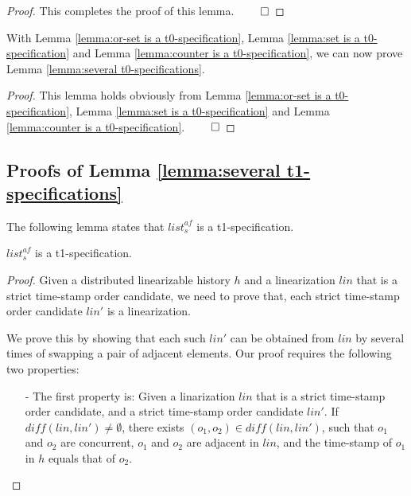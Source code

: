 {\begin {proof}
This completes the proof of this lemma. $\qed$
\end {proof}


With Lemma \ref{lemma:or-set is a t0-specification}, Lemma \ref{lemma:set is a t0-specification} and Lemma \ref{lemma:counter is a t0-specification}, we can now prove Lemma \ref{lemma:several t0-specifications}.


\SeveralTZeroSpecifications*

\begin {proof}
This lemma holds obviously from Lemma \ref{lemma:or-set is a t0-specification}, Lemma \ref{lemma:set is a t0-specification} and Lemma \ref{lemma:counter is a t0-specification}. $\qed$
\end {proof}





\subsection{Proofs of Lemma \ref{lemma:several t1-specifications}}
\label{subsec:appendix proofs of Lemma several t1-specifications}


The following lemma states that $\mathit{list}_s^{\mathit{af}}$ is a t1-specification.

\begin{lemma}
\label{lemma:list-af is a t1-specification}
$\mathit{list}_s^{\mathit{af}}$ is a t1-specification.
\end{lemma}

\begin {proof}

Given a distributed linearizable history $h$ and a linearization $\mathit{lin}$ that is a strict time-stamp order candidate, we need to prove that, each strict time-stamp order candidate $\mathit{lin}'$ is a linearization.

We prove this by showing that each such $\mathit{lin}'$ can be obtained from $\mathit{lin}$ by several times of swapping a pair of adjacent elements. Our proof requires the following two properties:

\begin{itemize}
\setlength{\itemsep}{0.5pt}
\item[-] The first property is: Given a linarization $\mathit{lin}$ that is a strict time-stamp order candidate, and a strict time-stamp order candidate $\mathit{lin}'$. If $\mathit{diff}(\mathit{lin},\mathit{lin}') \neq \emptyset$, there exists $(o_1,o_2) \in \mathit{diff}(\mathit{lin},\mathit{lin}')$, such that $o_1$ and $o_2$ are concurrent, $o_1$ and $o_2$ are adjacent in $\mathit{lin}$, and the time-stamp of $o_1$ in $h$ equals that of $o_2$.


\end{itemize}
\end{proof}}

